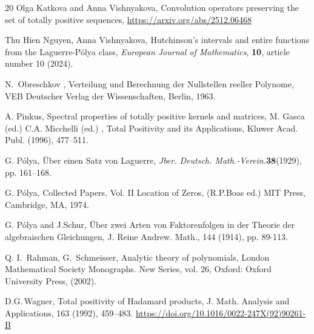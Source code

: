 \documentclass[12pt]{amsart}
\numberwithin{count}{section}
\begin{document}
\begin{thebibliography}{20}
  Olga Katkova and Anna Vishnyakova, Convolution operators 
preserving the set of totally positive sequences, \url{  https://arxiv.org/abs/2512.06468}

Thu Hien Nguyen, Anna Vishnyakova, Hutchinson's intervals and entire 
functions from the Laguerre-P\'olya class,  \textsl{European Journal of Mathematics}, 
\textbf{10},  article number 10 (2024).

N.~Obreschkov , Verteilung und Berechnung der Nullstellen reeller
Polynome, VEB Deutscher Verlag der Wissenschaften, Berlin, 1963.


A. Pinkus, Spectral properties of totally positive kernels and matrices, 
M. Gasca (ed.) C.A. Micchelli (ed.) , Total Positivity and its Applications, 
Kluwer Acad. Publ. (1996), 477--511.

G. P\'olya,  \"Uber einen Satz von Laguerre, \textsl{Jber.
Deutsch. Math.-Verein.}\textbf{38}(1929), pp. 161--168.

G. P\'olya, Collected Papers, Vol. II Location of Zeros, (R.P.Boas
ed.) MIT Press, Cambridge, MA, 1974.

G. P\'olya and J.Schur, \"Uber zwei Arten von Faktorenfolgen in der Theorie
der algebraischen Gleichungen, J. Reine Andrew. Math., 144 (1914),
pp. 89-113.

Q. I.~Rahman, G.~Schmeisser, Analytic theory of polynomials, 
London Mathematical Society Monographs. New Series, vol. 26, Oxford: 
Oxford University Press,  (2002).  

 D.G.\,Wagner, Total positivity of Hadamard products, J. Math. Analysis 
and Applications, 163 (1992), 459--483. \url{https://doi.org/10.1016/0022-247X(92)90261-B}





\end{thebibliography}
\end{document}
